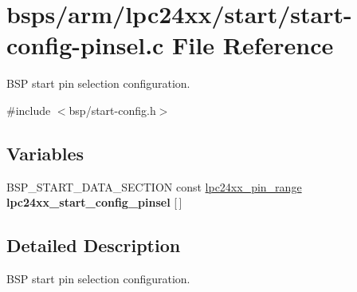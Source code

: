 \hypertarget{start-config-pinsel_8c}{}\section{bsps/arm/lpc24xx/start/start-\/config-\/pinsel.c File Reference}
\label{start-config-pinsel_8c}


B\+SP start pin selection configuration.  


{\ttfamily \#include $<$bsp/start-\/config.\+h$>$}\newline
\subsection*{Variables}
\begin{DoxyCompactItemize}
\item 
\mbox{\label{start-config-pinsel_8c_ac451140de50a4c6306d396e1c5a154ef}} 
B\+S\+P\+\_\+\+S\+T\+A\+R\+T\+\_\+\+D\+A\+T\+A\+\_\+\+S\+E\+C\+T\+I\+ON const \mbox{\hyperlink{unionlpc24xx__pin__range}{lpc24xx\+\_\+pin\+\_\+range}} {\bfseries lpc24xx\+\_\+start\+\_\+config\+\_\+pinsel} \mbox{[}$\,$\mbox{]}
\end{DoxyCompactItemize}


\subsection{Detailed Description}
B\+SP start pin selection configuration. 

